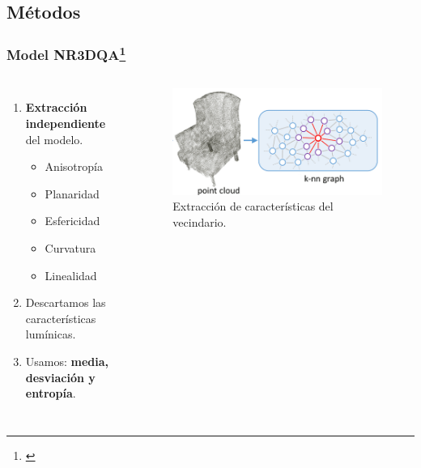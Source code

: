 \subsection{Métodos}
\begin{frame}
  \frametitle{Model NR3DQA\footnote[frame]{\cite{NR3DQA}}}
  \begin{columns}
    \begin{enumerate}[<+->]
      \item \textbf{Extracción independiente} del modelo.
        \begin{itemize}
          \item Anisotropía
          \item Planaridad
          \item Esfericidad 
          \item Curvatura 
          \item Linealidad
        \end{itemize}
      \item \alert{Descartamos} las características lumínicas.
      \item Usamos: \textbf{media, desviación y entropía}.
    \end{enumerate}
    \begin{figure}
      \begin{center}
        \includegraphics[width=\textwidth]{imagenes/chapter3/PatchSelection}
      \end{center}
      \caption{Extracción de características del vecindario.}
    \end{figure}
    \end{columns}
\end{frame}

